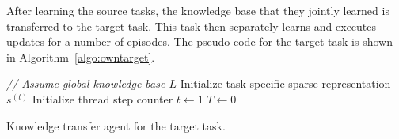 After learning the source tasks, the knowledge base that they jointly learned is transferred to the target task.
This task then separately learns and executes updates for a number of episodes.
The pseudo-code for the target task is shown in Algorithm~\ref{algo:owntarget}.\\
\begin{algorithm}[htb]
\DontPrintSemicolon
\emph{// Assume global knowledge base $L$}\;
Initialize task-specific sparse representation $s^{(t)}$\;
Initialize thread step counter $t\gets 1$\;
$T \gets 0$\;
\caption[Knowledge transfer agent for the target task]{Knowledge transfer agent for the target task.}
\label{algo:owntarget}
\end{algorithm}
